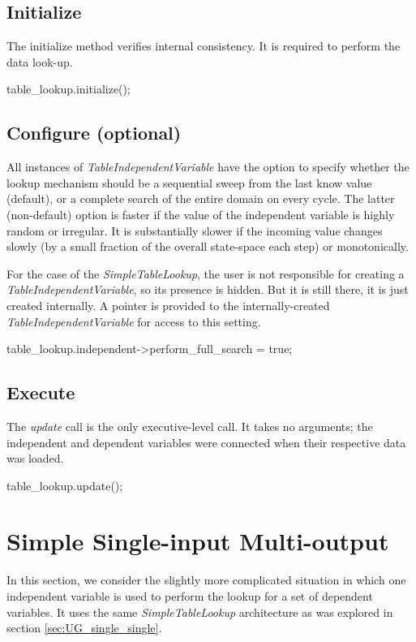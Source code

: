 \documentclass[11pt,fleqn]{report}
\begin{document}
\subsection{Initialize}\label{sec:UG_single_single_initialize}
The initialize method verifies internal consistency.  It is required to
 perform the data look-up.
\begin{code}
table_lookup.initialize();
\end{code}

\subsection{Configure (optional)}\label{sec:UG_single_single_config}
All instances of \textit{TableIndependentVariable} have the option to
 specify whether the lookup mechanism should be a sequential sweep
 from the last know value (default), or a complete search of the entire
 domain on every cycle.  The latter (non-default) option is faster if
 the value of the independent variable is highly random or irregular.
 It is substantially slower if the incoming value changes slowly (by a
 small fraction of the overall state-space each step) or
 monotonically.

For the case of the \textit{SimpleTableLookup}, the user is not responsible
 for creating a \textit{TableIndependentVariable}, so its presence is hidden.
 But it is still there, it is just created internally.
 A pointer is provided to the
 internally-created \textit{TableIndependentVariable} for
 access to this setting.
\begin{code}
table_lookup.independent->perform_full_search = true;
\end{code}



\subsection{Execute}\label{sec:UG_single_single_exec}
The \textit{update} call is the only executive-level call.
It takes no arguments; the independent and dependent variables
were connected when their respective data was loaded.
\begin{code}
table_lookup.update();
\end{code}


\section{Simple Single-input Multi-output} \label{sec:UG_single_multi}
In this section, we consider the slightly more complicated situation in which
one independent variable is used to perform the lookup for a set of dependent
variables.  It uses the same \textit{SimpleTableLookup} architecture as
was explored in section \ref{sec:UG_single_single}.
\end{document}
